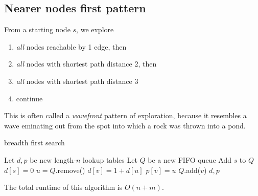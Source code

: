 \documentclass[titlepage, 12pt, leqno]{article}
\begin{document}
\subsection{Nearer nodes first pattern}
From a starting node $s$, we explore
\begin{enumerate}
    \item \textit{all} nodes reachable by 1 edge, then
    \item \textit{all} nodes with shortest path distance 2, then
    \item \textit{all} nodes with shortest path distance 3
    \item continue
\end{enumerate}

This is often called a \textit{wavefront} pattern of exploration, because it
resembles a wave eminating out from the spot into which a rock was thrown into a
pond.

\begin{algorithm}
\caption{breadth first search}
\begin{algorithmic}[1]
    \State Let $d,p$ be new length-$n$ lookup tables
    \State Let $Q$ be a new FIFO queue
    \State Add $s$ to $Q$
    \State $d[s]=0$
        \State $u = Q$.remove()
                \State $d[v] = 1 + d[u]$
                \State $p[v] = u$
                \State $Q$.add($v$)
            \EndIf
        \EndFor 
    \EndWhile
    \State \Return $d,p$
\EndProcedure 
\end{algorithmic}
\end{algorithm}

The total runtime of this  algorithm is $O(n+m)$.
\end{document}
